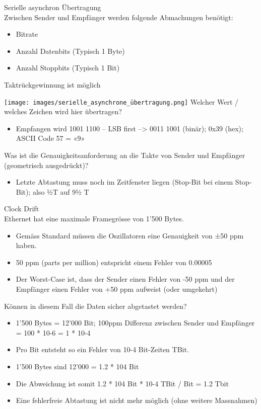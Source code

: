 \begin{definition}{Serielle asynchron Übertragung}\\
    Zwischen Sender und Empfänger werden folgende Abmachungen benötigt:
    \begin{itemize}
        \item Bitrate
        \item Anzahl Datenbits (Typisch 1 Byte)
        \item Anzahl Stoppbits (Typisch 1 Bit)
    \end{itemize}
    Taktrückgewinnung ist möglich
\end{definition}

\begin{example}
    \texttt{[image: images/serielle\_asynchrone\_übertragung.png]}
    Welcher Wert / welches Zeichen wird hier übertragen?
    \begin{itemize}
        \item Empfangen wird 1001 1100 – LSB first –> 0011 1001 (binär); 0x39 (hex); ASCII Code 57 = «9»
    \end{itemize}
    Was ist die Genauigkeitsanforderung an die Takte von Sender und Empfänger (geometrisch
    ausgedrückt)?
    \begin{itemize}
        \item Letzte Abtastung muss noch im Zeitfenster liegen (Stop-Bit bei einem Stop-Bit); also ½T auf 9½ T
    \end{itemize}
\end{example}

\begin{example2}{Clock Drift}\\
    Ethernet hat eine maximale Framegrösse von 1’500 Bytes.
    \begin{itemize}
        \item Gemäss Standard müssen die Oszillatoren eine Genauigkeit von ±50 ppm haben.
        \item 50 ppm (parts per million) entspricht einem Fehler von 0.00005
        \item Der Worst-Case ist, dass der Sender einen Fehler von -50 ppm und der Empfänger einen Fehler von +50 ppm aufweist (oder umgekehrt)
    \end{itemize}
    Können in diesem Fall die Daten sicher abgetastet werden?
    \begin{itemize}
        \item 1'500 Bytes = 12'000 Bit; 100ppm Differenz zwischen Sender und Empfänger = 100 * 10-6 = 1 * 10-4
        \item Pro Bit entsteht so ein Fehler von 10-4 Bit-Zeiten TBit.
        \item 1’500 Bytes sind 12’000 = 1.2 * 104 Bit
        \item Die Abweichung ist somit 1.2 * 104 Bit * 10-4 TBit / Bit = 1.2 Tbit
        \item Eine fehlerfreie Abtastung ist nicht mehr möglich (ohne weitere Massnahmen)
    \end{itemize}
\end{example2}

